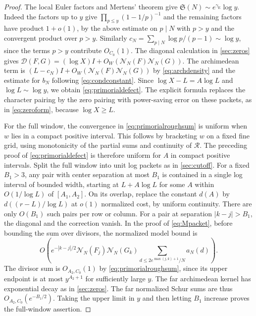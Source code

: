 \documentclass[11pt,a4paper]{article}
\numberwithin{equation}{section}
\newcommand{\SSS}{\mathfrak S}
\newcommand{\NN}{\mathcal N_N}
\begin{document}
\begin{proof}
The local Euler factors and Mertens' theorem give
$\SSS(N)\sim e^{\gamma_{\mathrm E}}\log y$.
Indeed the factors up to $y$ give
$\prod_{p\le y}(1-1/p)^{-1}$ and the remaining factors
have product $1+o(1)$, by the above estimate on $p\mid N$
with $p>y$ and the convergent product over $p>y$.
Similarly $c_N=\sum_{p\mid N}\log p/(p-1)\sim\log y$,
since the terms $p>y$ contribute $O_{C_0}(1)$.
The diagonal calculation in \cref{sec:zeros} gives
$\mathcal D(F,G)=(\log X)I+O_W(\NN(F)\NN(G))$.
The archimedean term is
$(L-c_N)I+O_W(\NN(F)\NN(G))$ by \cref{eq:archdensity}
and the estimate for $b_N$ following
\cref{eq:condconstant}. Since $\log X-L=A\log L$
and $\log L\sim\log y$, we obtain \cref{eq:primorialdefect}.
The explicit formula replaces the character pairing by
the zero pairing with power-saving error on these packets,
as in \cref{eq:zeroform}, because $\log X\ge L$.

For the full window, the convergence in
\cref{eq:primorialroughsum} is uniform when $w$ lies
in a compact positive interval. This follows by
bracketing $w$ on a fixed fine grid, using monotonicity
of the partial sums and continuity of $\mathcal R$.
The preceding proof of \cref{eq:primorialdefect} is
therefore uniform for $A$ in compact positive intervals.
Split the full window into unit log packets as in
\cref{sec:cutoff}. For a fixed $B_1>3$, any pair with
center separation at most $B_1$ is contained in a
single log interval of bounded width, starting at
$L+A\log L$ for some $A$ within $O(1/\log L)$ of
$[A_1,A_2]$. On its overlap, replace the constant
$d(A)$ by $d((r-L)/\log L)$ at $o(1)$ normalized cost,
by uniform continuity. There are only $O(B_1)$ such
pairs per row or column. For a pair at separation
$|k-j|>B_1$, the diagonal and the correction vanish.
In the proof of \cref{eq:Mpacket}, before bounding the
sum over divisors, the normalized model bound is
\[
 O\!\left(e^{-|k-j|/2}\NN(F_j)\NN(G_k)
          \sum_{d\le 2e^{\max(j,k)+1}/N}a_N(d)\right).
\]
The divisor sum is $O_{A_2,C_0}(1)$ by
\cref{eq:primorialroughsum}, since its upper endpoint
is at most $y^{A_2+1}$ for sufficiently large $y$.
The far archimedean kernel has exponential decay as
in \cref{sec:zeros}. The far normalized Schur sums
are thus $O_{A_2,C_0}(e^{-B_1/2})$. Taking the upper
limit in $y$ and then letting $B_1$ increase proves
the full-window assertion.


\end{proof}
\end{document}
